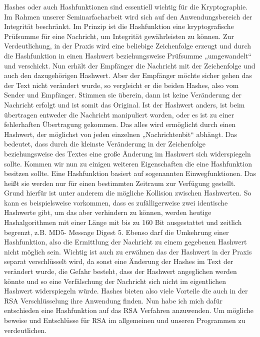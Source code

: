 Hashes oder auch Hashfunktionen sind essentiell wichtig für die Kryptographie. Im Rahmen unserer Seminarfacharbeit wird sich auf den Anwendungsbereich der Integrität beschränkt. Im Prinzip ist die Hashfunktion eine kryptografische Prüfsumme für eine Nachricht, um Integrität gewährleisten zu können. Zur Verdeutlichung, in der Praxis wird eine beliebige Zeichenfolge erzeugt und durch die Hashfunktion in einen Hashwert beziehungsweise Prüfsumme „umgewandelt“ und verschickt. Nun erhält der Empfänger die Nachricht mit der Zeichenfolge und auch den dazugehörigen Hashwert. Aber der Empfänger möchte sicher gehen das der Text nicht verändert wurde, so vergleicht er die beiden Hashes, also vom Sender und Empfänger. Stimmen sie überein, dann ist keine Veränderung der Nachricht erfolgt und ist somit das Original. Ist der Hashwert anders, ist beim übertragen entweder die Nachricht manipuliert worden, oder es ist zu einer fehlerhaften Übertragung gekommen. Das alles wird ermöglicht durch einen Hashwert, der möglichst von jeden einzelnen „Nachrichtenbit“ abhängt. Das bedeutet, dass durch die kleinste Veränderung in der Zeichenfolge beziehungsweise des Textes eine große Änderung im Hashwert sich widerspiegeln sollte. Kommen wir nun zu einigen weiteren Eigenschaften die eine Hashfunktion besitzen sollte. Eine Hashfunktion basiert auf sogenannten Einwegfunktionen. Das heißt sie werden nur für einen bestimmten Zeitraum zur Verfügung gestellt. Grund hierfür ist unter anderem die mögliche Kollision zwischen Hashwerten. So kann es beispielsweise vorkommen, dass es zufälligerweise zwei identische Hashwerte gibt, um das aber verhindern zu können, werden heutige Hashalgorithmen mit einer Länge mit bis zu 160 Bit ausgestattet und zeitlich begrenzt, z.B. MD5- Message Digest 5. Ebenso darf die Umkehrung einer Hashfunktion, also die Ermittlung der Nachricht zu einem gegebenen Hashwert nicht möglich sein. Wichtig ist auch zu erwähnen das der Hashwert in der Praxis separat verschlüsselt wird, da sonst eine Änderung der Hashes im Text der verändert wurde, die Gefahr besteht, dass der Hashwert angeglichen werden könnte und so eine Verfälschung der Nachricht sich nicht im eigentlichen Hashwert widerspiegeln würde. Hashes bieten also viele Vorteile die auch in der RSA Verschlüsselung ihre Anwendung finden. Nun habe ich mich dafür entschieden eine Hashfunktion auf das RSA Verfahren anzuwenden. Um mögliche beweise und Entschlüsse für RSA im allgemeinen und unseren Programmen zu verdeutlichen. \\

